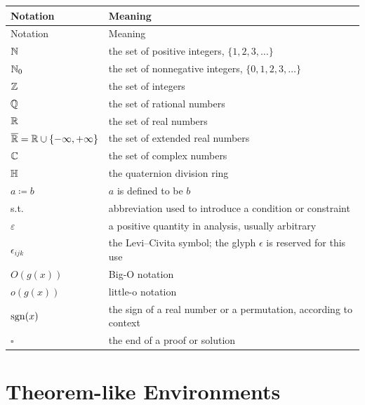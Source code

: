     \vspace{0.5em}

    {\small
    \renewcommand{\arraystretch}{1.18}
    \begin{longtable}{@{}L{0.24\textwidth}L{0.68\textwidth}@{}}
        \toprule
        Notation & Meaning \\
        \midrule
        \endfirsthead

        \toprule
        Notation & Meaning \\
        \midrule
        \endhead

        \bottomrule
        \endlastfoot

        $\mathbb{N}$ & the set of positive integers, $\{1,2,3,\dots\}$ \\
        $\mathbb{N}_0$ & the set of nonnegative integers, $\{0,1,2,3,\dots\}$ \\
        $\mathbb{Z}$ & the set of integers \\
        $\mathbb{Q}$ & the set of rational numbers \\
        $\mathbb{R}$ & the set of real numbers \\
        $\overline{\mathbb{R}}=\mathbb{R}\cup\{-\infty,+\infty\}$ & the set of extended real numbers \\
        $\mathbb{C}$ & the set of complex numbers \\
        $\mathbb{H}$ & the quaternion division ring \\
        $a\coloneqq b$ & $a$ is defined to be $b$ \\
        \textnormal{s.t.} & abbreviation used to introduce a condition or constraint \\
        $\varepsilon$ & a positive quantity in analysis, usually arbitrary \\
        $\epsilon_{ijk}$ & the Levi--Civita symbol; the glyph $\epsilon$ is reserved for this use \\
        $O(g(x))$ & Big-O notation \\
        $o(g(x))$ & little-o notation \\
        $\operatorname{sgn}(x)$ & the sign of a real number or a permutation, according to context \\
        $\square$ & the end of a proof or solution \\
    \end{longtable}
    }

    \section*{Theorem-like Environments}

